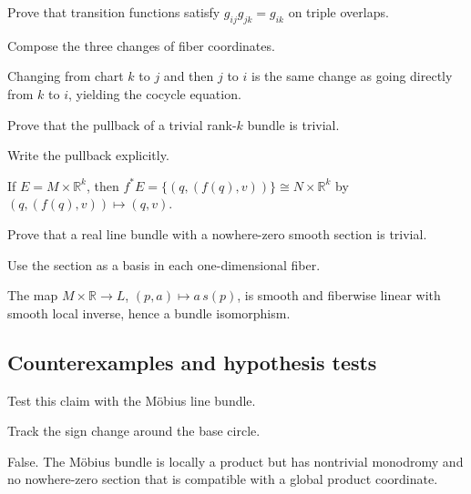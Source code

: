 \begin{exercise}\label{exr:vii07-ped-07}
Prove that transition functions satisfy \(g_{ij}g_{jk}=g_{ik}\) on triple overlaps.
\end{exercise}
\begin{hint}
Compose the three changes of fiber coordinates.
\end{hint}
\begin{solution}
Changing from chart \(k\) to \(j\) and then \(j\) to \(i\) is the same change as going directly from \(k\) to \(i\), yielding the cocycle equation.
\end{solution}

\begin{exercise}\label{exr:vii07-ped-08}
Prove that the pullback of a trivial rank-\(k\) bundle is trivial.
\end{exercise}
\begin{hint}
Write the pullback explicitly.
\end{hint}
\begin{solution}
If \(E=M\times\mathbb R^k\), then \(f^*E=\{(q,(f(q),v))\}\cong N\times\mathbb R^k\) by \((q,(f(q),v))\mapsto(q,v)\).
\end{solution}

\begin{exercise}\label{exr:vii07-ped-09}
Prove that a real line bundle with a nowhere-zero smooth section is trivial.
\end{exercise}
\begin{hint}
Use the section as a basis in each one-dimensional fiber.
\end{hint}
\begin{solution}
The map \(M\times\mathbb R\to L\), \((p,a)\mapsto a\,s(p)\), is smooth and fiberwise linear with smooth local inverse, hence a bundle isomorphism.
\end{solution}

\subsection*{Counterexamples and hypothesis tests}

\begin{exercise}\label{exr:vii07-ped-10}
Test this claim with the Möbius line bundle.
\end{exercise}
\begin{hint}
Track the sign change around the base circle.
\end{hint}
\begin{solution}
False.  The Möbius bundle is locally a product but has nontrivial monodromy and no nowhere-zero section that is compatible with a global product coordinate.
\end{solution}

